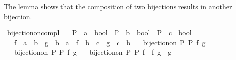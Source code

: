 \begin{isabellebody}
\endisatagproof
{\isafoldproof}%
%
\isadelimproof
%
\endisadelimproof
%
\begin{isamarkuptext}%
The lemma shows that the composition of two bijections results in another bijection.%
\end{isamarkuptext}\isamarkuptrue%
\isamarkupfalse%
\ bijection{\isacharunderscore}{\kern0pt}on{\isacharunderscore}{\kern0pt}compI{\isacharcolon}{\kern0pt}\isanewline
\ \ \ P\ {\isacharcolon}{\kern0pt}{\isacharcolon}{\kern0pt}\ {\isachardoublequoteopen}{\isacharprime}{\kern0pt}a\ {\isasymRightarrow}\ bool{\isachardoublequoteclose}\ \ P{\isacharprime}{\kern0pt}\ {\isacharcolon}{\kern0pt}{\isacharcolon}{\kern0pt}\ {\isachardoublequoteopen}{\isacharprime}{\kern0pt}b\ {\isasymRightarrow}\ bool{\isachardoublequoteclose}\ \ P{\isacharprime}{\kern0pt}{\isacharprime}{\kern0pt}\ {\isacharcolon}{\kern0pt}{\isacharcolon}{\kern0pt}\ {\isachardoublequoteopen}{\isacharprime}{\kern0pt}c\ {\isasymRightarrow}\ bool{\isachardoublequoteclose}\isanewline
\ \ \ f\ {\isacharcolon}{\kern0pt}{\isacharcolon}{\kern0pt}\ {\isachardoublequoteopen}{\isacharprime}{\kern0pt}a\ {\isasymRightarrow}\ {\isacharprime}{\kern0pt}b{\isachardoublequoteclose}\ \ g\ {\isacharcolon}{\kern0pt}{\isacharcolon}{\kern0pt}\ {\isachardoublequoteopen}{\isacharprime}{\kern0pt}b\ {\isasymRightarrow}\ {\isacharprime}{\kern0pt}a{\isachardoublequoteclose}\ \ f{\isacharprime}{\kern0pt}\ {\isacharcolon}{\kern0pt}{\isacharcolon}{\kern0pt}\ {\isachardoublequoteopen}{\isacharprime}{\kern0pt}b\ {\isasymRightarrow}\ {\isacharprime}{\kern0pt}c{\isachardoublequoteclose}\ \ g{\isacharprime}{\kern0pt}\ {\isacharcolon}{\kern0pt}{\isacharcolon}{\kern0pt}\ {\isachardoublequoteopen}{\isacharprime}{\kern0pt}c\ {\isasymRightarrow}\ {\isacharprime}{\kern0pt}b{\isachardoublequoteclose}\isanewline
\ \ \ {\isachardoublequoteopen}bijection{\isacharunderscore}{\kern0pt}on\ P\ P{\isacharprime}{\kern0pt}\ f\ g{\isachardoublequoteclose}\isanewline
\ \ \ {\isachardoublequoteopen}bijection{\isacharunderscore}{\kern0pt}on\ P{\isacharprime}{\kern0pt}\ P{\isacharprime}{\kern0pt}{\isacharprime}{\kern0pt}\ f{\isacharprime}{\kern0pt}\ g{\isacharprime}{\kern0pt}{\isachardoublequoteclose}\isanewline
\ \ \ {\isachardoublequoteopen}bijection{\isacharunderscore}{\kern0pt}on\ P\ P{\isacharprime}{\kern0pt}{\isacharprime}{\kern0pt}\ {\isacharparenleft}{\kern0pt}f{\isacharprime}{\kern0pt}\ {\isasymcirc}\ f{\isacharparenright}{\kern0pt}\ {\isacharparenleft}{\kern0pt}g\ {\isasymcirc}\ g{\isacharprime}{\kern0pt}{\isacharparenright}{\kern0pt}{\isachardoublequoteclose}\isanewline

\end{isabellebody}
